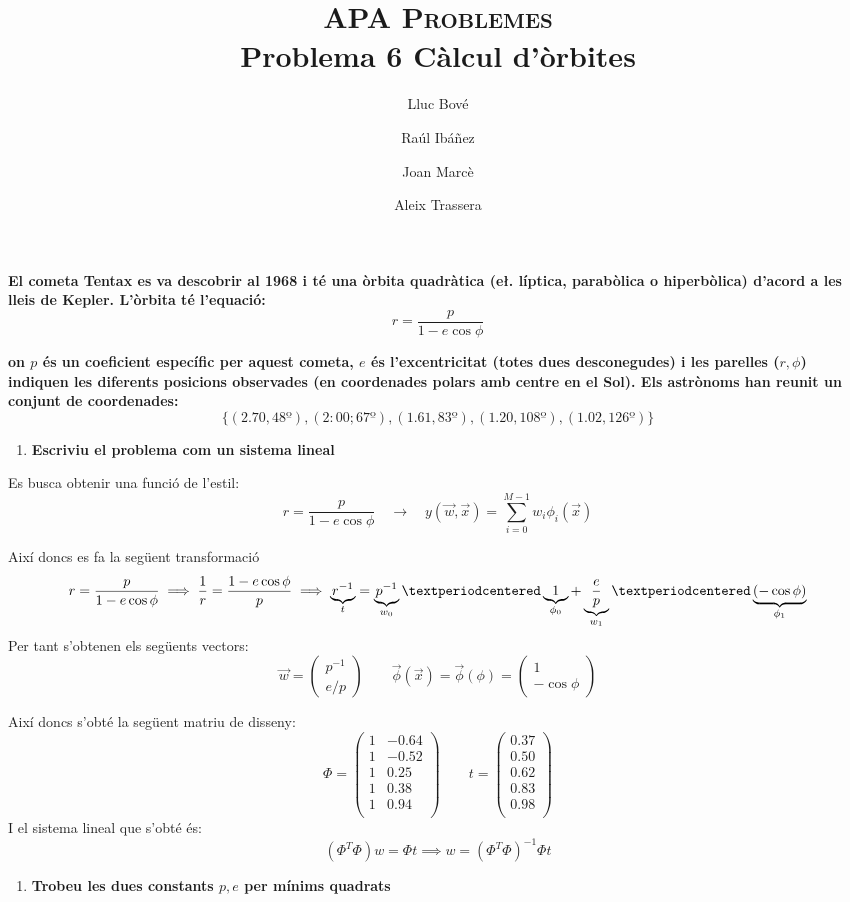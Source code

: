 \documentclass[a4paper]{article}
\title{\textsc{APA Problemes} \\ Problema 6 Càlcul d'òrbites}
\author{Lluc Bové \and Raúl Ibáñez \and Joan Marcè \and Aleix Trassera}
\date{}
\begin{document}
\maketitle

\textbf{El cometa Tentax es va descobrir al 1968 i té una òrbita quadràtica (e\l. líptica, parabòlica o hiperbòlica) d'acord a les lleis de Kepler. L'òrbita té l'equació:}
$$
r = \frac{p}{1 - e \cos \phi}
$$

\textbf{on $p$ és un coeficient específic per aquest cometa, $e$ és l'excentricitat (totes dues desconegudes) i les parelles ($r,\phi$) indiquen les diferents posicions observades (en coordenades polars amb centre en el Sol). Els astrònoms han reunit un conjunt de coordenades:}
$$
\{(2.70, 48º), (2:00; 67º), (1.61, 83º), (1.20, 108º), (1.02, 126º)\}
$$

\begin{enumerate}
	\item \textbf{Escriviu el problema com un sistema lineal}
\end{enumerate}

Es busca obtenir una funció de l'estil:
$$
r = \frac{p}{1 - e \cos\phi} \quad \longrightarrow \quad y(\vec{w}, \vec{x}) = \sum_{i=0}^{M - 1} w_i \phi_i(\vec{x})
$$

Així doncs es fa la següent transformació
$$
r = \frac{p}{1 - e \cos \phi} \implies \frac{1}{r} = \frac{1 - e \cos \phi}{p} 
\implies \underbrace{r^{-1}}_{t} = 
\underbrace{p^{-1}}_{w_0}·
\underbrace{1}_{\mathclap{\phi_0}} +
\underbrace{\frac{e}{p}}_{w_1}·\underbrace{(-\cos\phi)}_{\phi_1}
$$
Per tant s'obtenen els següents vectors:
$$
\vec{w} = 
\begin{pmatrix}
p^{-1}\\
e/p
\end{pmatrix}
\qquad
\vec{\phi}(\vec{x}) = \vec{\phi}(\phi) =
\begin{pmatrix}
1\\
- \cos \phi 
\end{pmatrix}
$$

Així doncs s'obté la següent matriu de disseny:
$$
\Phi = 
\begin{pmatrix}
1 & -0.64 \\
1 & -0.52 \\
1 & 0.25 \\
1 & 0.38 \\
1 & 0.94 \\
\end{pmatrix}
\qquad
t =
\begin{pmatrix}
0.37 \\
0.50 \\
0.62 \\
0.83 \\
0.98 \\
\end{pmatrix}
$$
I el sistema lineal que s'obté és:
$$
(\Phi^T\Phi)w = \Phi t \implies w = (\Phi^T\Phi)^{-1} \Phi t 
$$
\begin{enumerate}[resume]
	\item \textbf{Trobeu les dues constants $p,e$ per mínims quadrats}
\end{enumerate}
\end{document}

